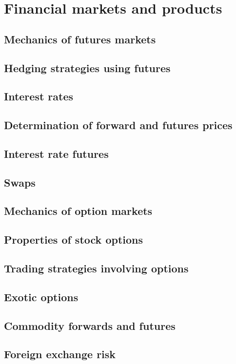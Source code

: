 \section{Financial markets and products}

\subsection{Mechanics of futures markets}
\subsection{Hedging strategies using futures}
\subsection{Interest rates}
\subsection{Determination of forward and futures prices}
\subsection{Interest rate futures}
\subsection{Swaps}
\subsection{Mechanics of option markets}
\subsection{Properties of stock options}
\subsection{Trading strategies involving options}
\subsection{Exotic options}
\subsection{Commodity forwards and futures}
\subsection{Foreign exchange risk}
